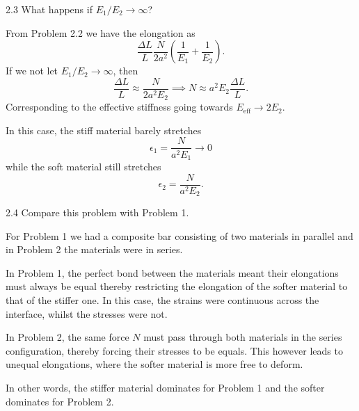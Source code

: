 
  \begin{problem}{2.3}
    What happens if $E_1 / E_2 \to \infty$?
  \end{problem}

  \begin{derivation}
    From Problem 2.2 we have the elongation as
    \begin{equation*}
      \frac{\Delta L}{L} \frac{N}{2a^2} \left( \frac{1}{E_1} + \frac{1}{E_2} \right)
    .\end{equation*}
    If we not let $E_1 / E_2 \to \infty$, then
    \begin{equation*}
      \frac{\Delta L}{L} \approx \frac{N}{2a^2 E_2} \implies N \approx a^2 E_2 \frac{\Delta L}{L}
    .\end{equation*}
    Corresponding to the effective stiffness going towards $E_{\mathrm{eff}} \to 2 E_2$.

    In this case, the stiff material barely stretches
    \begin{equation*}
      \epsilon_1 = \frac{N}{a^2 E_1} \to 0
    \end{equation*}
    while the soft material still stretches
    \begin{equation*}
      \epsilon_2 = \frac{N}{a^2 E_2}
    .\end{equation*}
  \end{derivation}


  \begin{problem}{2.4}
    Compare this problem with Problem 1.
  \end{problem}

  \begin{derivation}
    For Problem 1 we had a composite bar consisting of two materials in parallel and in Problem 2 the materials were in series.

    In Problem 1, the perfect bond between the materials meant their elongations must always be equal thereby restricting the elongation of the softer material to that of the stiffer one.
    In this case, the strains were continuous across the interface, whilst the stresses were not.

    In Problem 2, the same force $N$ must pass through both materials in the series configuration, thereby forcing their stresses to be equals.
    This however leads to unequal elongations, where the softer material is more free to deform.

    In other words, the stiffer material dominates for Problem 1 and the softer dominates for Problem 2.
  \end{derivation}



